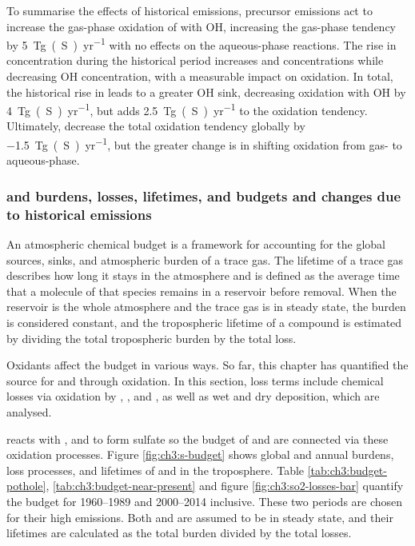 To summarise the effects of historical emissions,  precursor emissions act to increase the gas-phase oxidation of  with OH, increasing the gas-phase tendency by \qty{5}{Tg(S)~yr^{-1}} with no effects on the aqueous-phase reactions. The rise in  concentration during the historical period increases  and  concentrations while decreasing OH concentration, with a measurable impact on  oxidation. In total, the historical rise in  leads to a greater OH sink, decreasing  oxidation with OH by \qty{4}{Tg(S)~yr^{-1}}, but adds \qty{2.5}{Tg(S)~yr^{-1}} to the  oxidation tendency. Ultimately,  decrease the total oxidation tendency globally by \qty{-1.5}{Tg(S)~yr^{-1}}, but the greater change is in shifting oxidation from gas- to aqueous-phase.


\subsubsection{\textsoo{} and \textsoooo{} burdens, losses, lifetimes, and budgets and changes due to historical emissions}


An atmospheric chemical budget is a framework for accounting for the global sources, sinks, and atmospheric burden of a trace gas. The lifetime of a trace gas describes how long it stays in the atmosphere and is defined as the average time that a molecule of that species remains in a reservoir before removal. When the reservoir is the whole atmosphere and the trace gas is in steady state, the burden is considered constant, and the tropospheric lifetime of a compound is estimated by dividing the total tropospheric burden by the total loss. 

Oxidants affect the  budget in various ways. So far, this chapter has quantified the source for  and  through  oxidation. In this section,  loss terms include chemical losses via oxidation by , , and , as well as wet and dry deposition, which are analysed. 


 reacts with ,  and  to form sulfate so the budget of  and  are connected via these oxidation processes. Figure \ref{fig:ch3:s-budget} shows global and annual burdens, loss processes, and lifetimes of  and  in the troposphere. Table \ref{tab:ch3:budget-pothole}, \ref{tab:ch3:budget-near-present} and figure \ref{fig:ch3:so2-losses-bar} quantify the budget for 1960--1989 and 2000--2014 inclusive. These two periods are chosen for their high  emissions. Both  and  are assumed to be in steady state, and their lifetimes are calculated as the total burden divided by the total losses.


